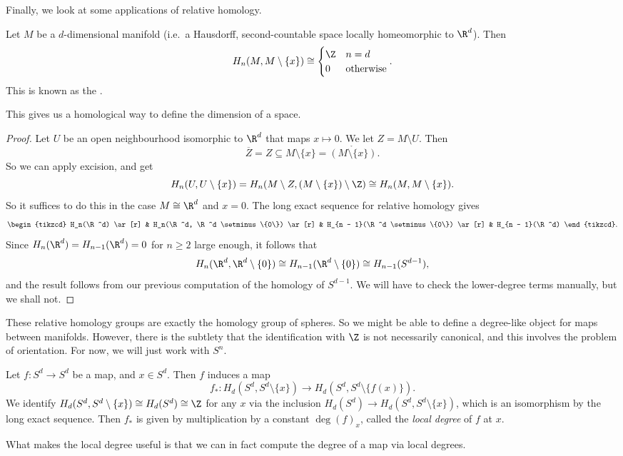 \documentclass[a4paper]{article}
\theoremstyle{definition}
\begin{document}
Finally, we look at some applications of relative homology.

\begin{lemma}
  Let $M$ be a $d$-dimensional manifold (i.e.\ a Hausdorff, second-countable space locally homeomorphic to $\R^d$). Then
  \[
    H_n(M, M \setminus \{x\}) \cong
    \begin{cases}
      \Z & n = d\\
      0 & \text{otherwise}
    \end{cases}.
  \]
  This is known as the .
\end{lemma}
This gives us a homological way to define the dimension of a space.

\begin{proof}
  Let $U$ be an open neighbourhood isomorphic to $\R^d$ that maps $x \mapsto 0$. We let $Z = M\setminus U$. Then
  \[
    \overline{Z} = Z \subseteq M \setminus \{x\} = \mathring{(M \setminus \{x\})}.
  \]
  So we can apply excision, and get
  \[
    H_n(U, U \setminus \{x\}) = H_n(M\setminus Z, (M\setminus \{x\})\setminus \Z) \cong H_n(M, M\setminus \{x\}).
  \]
  So it suffices to do this in the case $M \cong \R^d$ and $x = 0$. The long exact sequence for relative homology gives
  \[
    \begin{tikzcd}
      H_n(\R^d) \ar[r] & H_n(\R^d, \R^d \setminus \{0\}) \ar[r] & H_{n - 1}(\R^d \setminus \{0\}) \ar[r] & H_{n - 1}(\R^d)
    \end{tikzcd}.
  \]
  Since $H_n(\R^d) = H_{n - 1}(\R^d) = 0$ for $n \geq 2$ large enough, it follows that
  \[
    H_n(\R^d, \R^d \setminus \{0\}) \cong H_{n - 1}(\R^d \setminus \{0\}) \cong H_{n - 1}(S^{d - 1}),
  \]
  and the result follows from our previous computation of the homology of $S^{d - 1}$. We will have to check the lower-degree terms manually, but we shall not.
\end{proof}

These relative homology groups are exactly the homology group of spheres. So we might be able to define a degree-like object for maps between manifolds. However, there is the subtlety that the identification with $\Z$ is not necessarily canonical, and this involves the problem of orientation. For now, we will just work with $S^n$.

\begin{defi}
  Let $f: S^d \to S^d$ be a map, and $x \in S^d$. Then $f$ induces a map
  \[
    f_*: H_d(S^d, S^d \setminus \{x\}) \to H_d(S^d, S^d \setminus \{f(x)\}).
  \]
  We identify $H_d(S^d, S^d \setminus \{x\}) \cong H_d(S^d) \cong \Z$ for any $x$ via the inclusion $H_d(S^d) \to H_d(S^d, S^d \setminus \{x\})$, which is an isomorphism by the long exact sequence. Then $f_*$ is given by multiplication by a constant $\deg(f)_x$, called the \emph{local degree} of $f$ at $x$.
\end{defi}
What makes the local degree useful is that we can in fact compute the degree of a map via local degrees.
\end{document}
